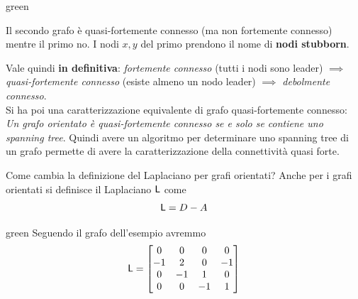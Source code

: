 \begin{mybox}{green}{}
\label{exmp:connett}
\begin{center}
\end{center}
Il secondo grafo \`e quasi-fortemente connesso (ma non fortemente connesso) mentre il primo no. I nodi $x,y$ del primo prendono il nome di \textbf{nodi stubborn}.
\end{mybox}

Vale quindi \textbf{in definitiva}: \textit{fortemente connesso} (tutti i nodi sono leader) $\implies$ \textit{quasi-fortemente connesso} (esiste almeno un nodo leader) $\implies$ \textit{debolmente connesso}.\\
Si ha poi una caratterizzazione equivalente di grafo quasi-fortemente connesso: \textit{Un grafo orientato \`e quasi-fortemente connesso se e solo se contiene uno spanning tree}. Quindi avere un algoritmo per determinare uno spanning tree di un grafo permette di avere la caratterizzazione della connettivit\`a quasi forte.

Come cambia la definizione del Laplaciano per grafi orientati? Anche per i grafi orientati si definisce il Laplaciano $\mathsf{L}$ come 
\begin{equation}
\mathsf{L} = D - A
\end{equation}
\begin{mybox}{green}{}
Seguendo il grafo dell'esempio avremmo
\begin{equation}
\mathsf{L} = \begin{bmatrix}
0 & 0 & 0 & 0 \\
-1 & 2 & 0 & -1 \\
0 & -1 & 1 & 0 \\
0 & 0 & -1 & 1
\end{bmatrix}
\end{equation}
\end{mybox}

